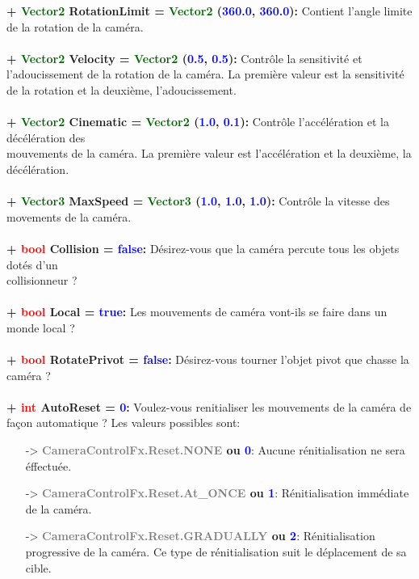 \documentclass[a4paper, 11pt]{article}
\begin{document}
	\textbf{+ \textcolor{darkgreen}{Vector2} RotationLimit = \textcolor{darkgreen}{Vector2} 
	(\textcolor{blue}{360.0}, \textcolor{blue}{360.0}):} Contient l'angle limite de la rotation de la 
	caméra.\\\\
	\textbf{+ \textcolor{darkgreen}{Vector2} Velocity = \textcolor{darkgreen}{Vector2} (\textcolor{blue}
	{0.5}, \textcolor{blue}{0.5}):} Contrôle la sensitivité et l'adoucissement de la rotation de la caméra. 
	La première valeur est la sensitivité de la rotation et la deuxième, l'adoucissement.\\\\
	\textbf{+ \textcolor{darkgreen}{Vector2} Cinematic = \textcolor{darkgreen}{Vector2} (\textcolor{blue}
	{1.0}, \textcolor{blue}{0.1}):} Contrôle l'accélération et la décélération des \\mouvements de la 
	caméra. La première valeur est l'accélération et la deuxième, la décélération.\\\\
	\textbf{+ \textcolor{darkgreen}{Vector3} MaxSpeed = \textcolor{darkgreen}{Vector3} (\textcolor{blue}
	{1.0}, \textcolor{blue}{1.0}, \textcolor{blue}{1.0}):} Contrôle la vitesse des movements de la caméra.
	\\\\
	\textbf{+ \textcolor{red}{bool} Collision = \textcolor{blue}{false}:} Désirez-vous que la caméra percute 
	tous les objets dotés d'un \\collisionneur ?\\\\
	\textbf{+ \textcolor{red}{bool} Local = \textcolor{blue}{true}:} Les mouvements de caméra vont-ils se 
	faire dans un monde local ?\\\\
	\textbf{+ \textcolor{red}{bool} RotatePrivot = \textcolor{blue}{false}:} Désirez-vous tourner l'objet 
	pivot que chasse la caméra ?\\\\
	\textbf{+ \textcolor{red}{int} AutoReset = \textcolor{blue}{0}:} Voulez-vous renitialiser les mouvements 
	de la caméra de façon automatique ? Les valeurs possibles sont:
	\begin{itemize}
		\item [-> \textbf{\textcolor{gray}{CameraControlFx.Reset.NONE} ou \textcolor{blue}{0}}:] Aucune 
		rénitialisation ne sera éffectuée.
		\item [-> \textbf{\textcolor{gray}{CameraControlFx.Reset.At\_ONCE} ou \textcolor{blue}{1}}:] 
		Rénitialisation immédiate de la caméra.
		\item [-> \textbf{\textcolor{gray}{CameraControlFx.Reset.GRADUALLY} ou \textcolor{blue}{2}}:] 
		Rénitialisation progressive de la caméra. Ce type de rénitialisation suit le déplacement de sa
		cible.\\
	\end{itemize}
\end{document}
